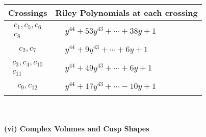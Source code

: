 \documentclass[1p]{elsarticle_modified}
\theoremstyle{definition}
\begin{document}
\begin{tabular}{m{50pt}|m{274pt}}
Crossings & \hspace{64pt}Riley Polynomials at each crossing \\
\hline $$\begin{aligned}c_{1},c_{5},c_{6}\\c_{8}\end{aligned}$$&$\begin{aligned}
&y^{44}+53 y^{43}+\cdots+38 y+1
\end{aligned}$\\
\hline $$\begin{aligned}c_{2},c_{7}\end{aligned}$$&$\begin{aligned}
&y^{44}+9 y^{43}+\cdots+6 y+1
\end{aligned}$\\
\hline $$\begin{aligned}c_{3},c_{4},c_{10}\\c_{11}\end{aligned}$$&$\begin{aligned}
&y^{44}+49 y^{43}+\cdots+6 y+1
\end{aligned}$\\
\hline $$\begin{aligned}c_{9},c_{12}\end{aligned}$$&$\begin{aligned}
&y^{44}+17 y^{43}+\cdots-10 y+1
\end{aligned}$\\
\hline
\end{tabular}\\~\\
\newpage\flushleft \textbf{(vi) Complex Volumes and Cusp Shapes}
\end{document}
